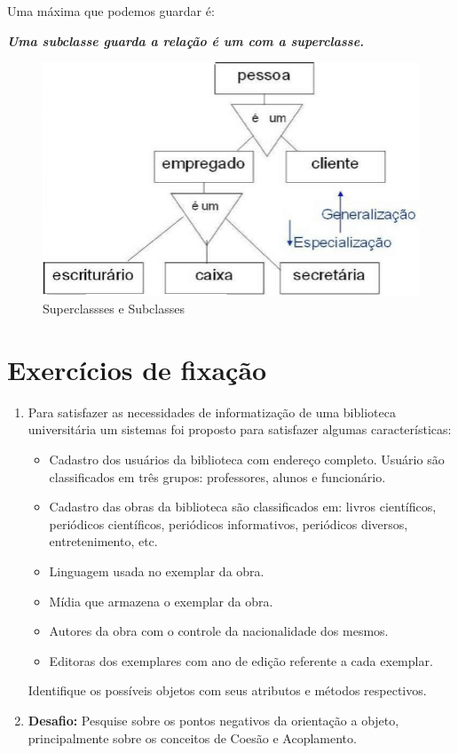 Uma máxima que podemos guardar é: 

\begin{center}
\textbf{\textit{Uma subclasse guarda a relação é um com a superclasse.}}    
\end{center}

\begin{figure}[H]
  \centering
  \includegraphics[scale=0.5]{imagens/sub-e-sup-classes.png}
  \caption{Superclassses e Subclasses}
  \label{fig:sub-e-sup-classes}
\end{figure}

\section{Exercícios de fixação}\label{exer:001}

\begin{enumerate}
    \item Para satisfazer as necessidades de informatização de uma biblioteca 
universitária um sistemas foi proposto para satisfazer algumas características:

\begin{itemize}
  \item Cadastro dos usuários da biblioteca com endereço completo. 
  Usuário são classificados em três grupos: professores, alunos e funcionário.  
  \item Cadastro das obras da biblioteca são classificados em: livros científicos, periódicos científicos, periódicos informativos, periódicos diversos, entretenimento, etc.
  \item Linguagem usada no exemplar da obra.
  \item Mídia que armazena o exemplar da obra.
  \item Autores da obra com o controle da nacionalidade dos mesmos.
  \item Editoras dos exemplares com ano de edição referente a cada exemplar.
\end{itemize}

Identifique os possíveis objetos com seus atributos e métodos respectivos.

\item \textbf{Desafio:} Pesquise sobre os pontos negativos da orientação a objeto, principalmente sobre os conceitos de Coesão e Acoplamento.
\end{enumerate}

